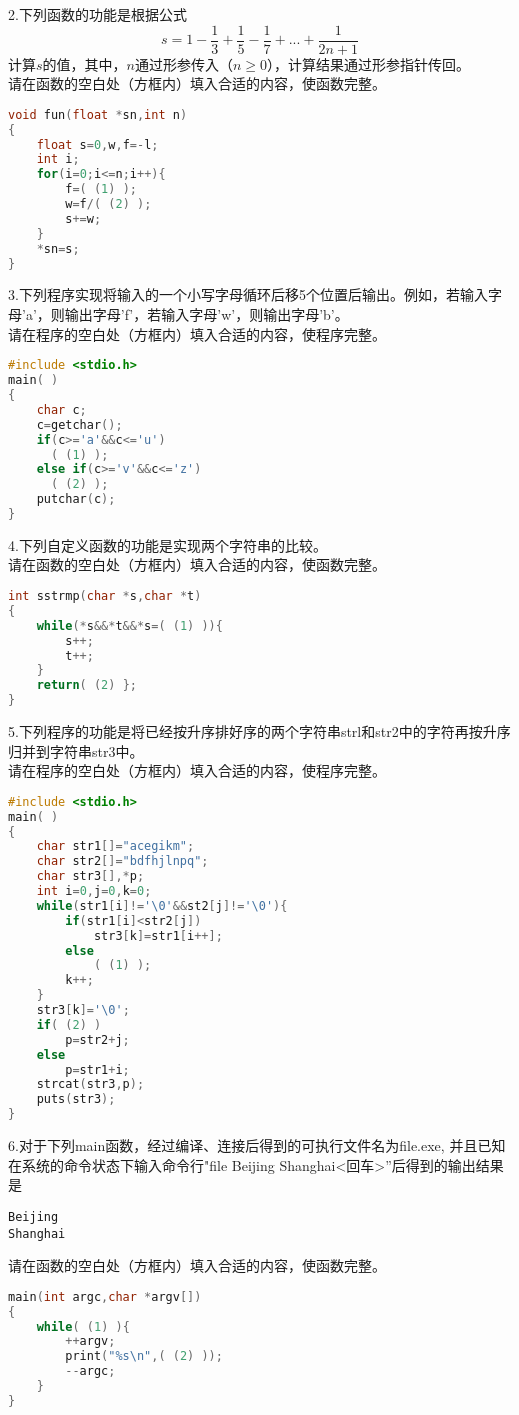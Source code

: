 2.下列函数的功能是根据公式
\begin{equation}
s=1-\frac{1}{3}+\frac{1}{5}-\frac{1}{7}+...+\frac{1}{2n+1}
\end{equation}
计算$s$的值，其中，$n$通过形参传入（$n\geqslant0$），计算结果通过形参指针传回。 \\
请在函数的空白处（方框内）填入合适的内容，使函数完整。
\begin{lstlisting}[language=cpp]
void fun(float *sn,int n)
{
    float s=0,w,f=-l;
    int i;
    for(i=0;i<=n;i++){
        f=( (1) );
        w=f/( (2) );
        s+=w;
    }
    *sn=s;
}
\end{lstlisting}

3.下列程序实现将输入的一个小写字母循环后移5个位置后输出。例如，若输入字母'a'，则输出字母'f'，若输入字母'w'，则输出字母'b'。 \\
请在程序的空白处（方框内）填入合适的内容，使程序完整。
\begin{lstlisting}[language=cpp]
#include <stdio.h>
main( )
{
    char c;
    c=getchar();
    if(c>='a'&&c<='u')
      ( (1) );
    else if(c>='v'&&c<='z')
      ( (2) );
    putchar(c);
}
\end{lstlisting}

4.下列自定义函数的功能是实现两个字符串的比较。 \\
请在函数的空白处（方框内）填入合适的内容，使函数完整。
\begin{lstlisting}[language=cpp]
int sstrmp(char *s,char *t)
{
    while(*s&&*t&&*s=( (1) )){
        s++;
        t++;
    }
    return( (2) };
}
\end{lstlisting}

5.下列程序的功能是将已经按升序排好序的两个字符串strl和str2中的字符再按升序归并到字符串str3中。 \\
请在程序的空白处（方框内）填入合适的内容，使程序完整。
\begin{lstlisting}[language=cpp]
#include <stdio.h>
main( )
{
    char str1[]="acegikm";
    char str2[]="bdfhjlnpq";
    char str3[],*p;
    int i=0,j=0,k=0;
    while(str1[i]!='\0'&&st2[j]!='\0'){
        if(str1[i]<str2[j])
            str3[k]=str1[i++];
        else
            ( (1) );
        k++;
    }
    str3[k]='\0';
    if( (2) )
        p=str2+j;
    else
        p=str1+i;
    strcat(str3,p);
    puts(str3);
}
\end{lstlisting}

6.对于下列main函数，经过编译、连接后得到的可执行文件名为file.exe, 并且已知在系统的命令状态下输入命令行"file Beijing Shanghai<回车>”后得到的输出结果是
\begin{lstlisting}[language=none]
Beijing
Shanghai
\end{lstlisting}
请在函数的空白处（方框内）填入合适的内容，使函数完整。
\begin{lstlisting}[language=cpp]
main(int argc,char *argv[])
{
    while( (1) ){
        ++argv;
        print("%s\n",( (2) ));
        --argc;
    }
}
\end{lstlisting}


